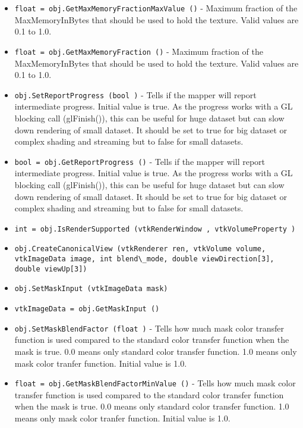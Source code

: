 \begin{itemize}
\item  \verb|float = obj.GetMaxMemoryFractionMaxValue ()| -  Maximum fraction of the MaxMemoryInBytes that should
 be used to hold the texture. Valid values are 0.1 to
 1.0.

\item  \verb|float = obj.GetMaxMemoryFraction ()| -  Maximum fraction of the MaxMemoryInBytes that should
 be used to hold the texture. Valid values are 0.1 to
 1.0.

\item  \verb|obj.SetReportProgress (bool )| -  Tells if the mapper will report intermediate progress.
 Initial value is true. As the progress works with a GL blocking
 call (glFinish()), this can be useful for huge dataset but can
 slow down rendering of small dataset. It should be set to true
 for big dataset or complex shading and streaming but to false for
 small datasets.

\item  \verb|bool = obj.GetReportProgress ()| -  Tells if the mapper will report intermediate progress.
 Initial value is true. As the progress works with a GL blocking
 call (glFinish()), this can be useful for huge dataset but can
 slow down rendering of small dataset. It should be set to true
 for big dataset or complex shading and streaming but to false for
 small datasets.

\item  \verb|int = obj.IsRenderSupported (vtkRenderWindow , vtkVolumeProperty )|

\item  \verb|obj.CreateCanonicalView (vtkRenderer ren, vtkVolume volume, vtkImageData image, int blend\_mode, double viewDirection[3], double viewUp[3])|

\item  \verb|obj.SetMaskInput (vtkImageData mask)|

\item  \verb|vtkImageData = obj.GetMaskInput ()|

\item  \verb|obj.SetMaskBlendFactor (float )| -  Tells how much mask color transfer function is used compared to the
 standard color transfer function when the mask is true.
 0.0 means only standard color transfer function.
 1.0 means only mask color tranfer function.
 Initial value is 1.0.

\item  \verb|float = obj.GetMaskBlendFactorMinValue ()| -  Tells how much mask color transfer function is used compared to the
 standard color transfer function when the mask is true.
 0.0 means only standard color transfer function.
 1.0 means only mask color tranfer function.
 Initial value is 1.0.


\end{itemize}
